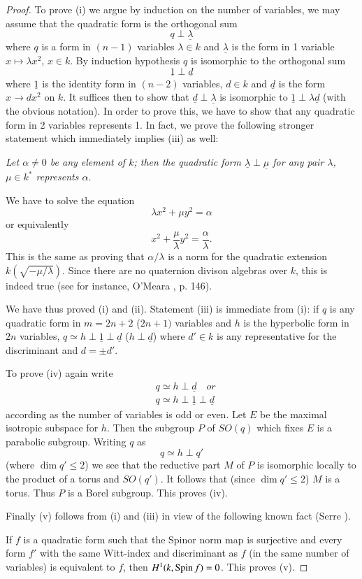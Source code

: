\begin{proof}
To prove (i) we argue by induction on the number of variables, we may assume that the quadratic form is the orthogonal sum
$$
q \perp \underline{\lambda}
$$
where $q$ is a form in $(n-1)$ variables $\lambda \in k$ and $\underline{\lambda}$ is the form in 1 variable $x \mapsto \lambda x^2$, $x \in k$.  By induction hypothesis $q$ is isomorphic to the orthogonal sum 
$$
\underline{1} \perp \underline{d}
$$
where $\underline{1}$  is the identity form in $(n-2)$ variables, $d \in k$ and $\underline{d}$ is the form $x \to d x^2$ on $k$. It suffices then to show that $\underline{d}\perp \underline{\lambda}$ is isomorphic to $\underline{1}\perp \lambda \underline{d}$ (with the obvious notation). In order to prove this, we have to show that any quadratic form in 2 variables represents 1. In fact, we prove the following stronger statement which immediately implies (iii) as well:


{\em Let $\alpha \neq 0$ be any element of $k$; then the quadratic form $\underline{\lambda} \perp \underline{\mu}$ for any pair $\lambda$, $\mu \in k^*$ represents $\alpha$.}

We have to solve the equation
$$
\lambda x^2 + \mu y^2 = \alpha
$$
or equivalently\pageoriginale
$$
x^2 + \frac{\mu}{\lambda} y^2 = \frac{\alpha}{\lambda}.
$$
This is the same as proving that $\alpha/\lambda$ is a norm for the quadratic extension $k(\sqrt{-\mu/\lambda})$. Since there are no quaternion divison algebras over $k$, this is indeed true (see for instance, O'Meara \cite{art17-key15}, p. 146).

We have thus proved (i) and (ii). Statement (iii) is immediate from (i): if $q$ is any quadratic form in $m = 2n + 2$ (\resp $2n +1)$ variables and $h$ is the hyperbolic form in $2n$ variables, $q \simeq h \perp \underline{1} \perp \underline{d}$ (\resp $h \perp \underline{d}$) where $d' \in k$ is any representative for the discriminant and $d = \pm d'$.

To prove (iv) again write
\begin{align*}
& q \simeq h \perp \underline{d} \quad { or }\\
& q \simeq h \perp \underline{1} \perp \underline{d}
\end{align*}
according as the number of variables is odd or even. Let $E$ be the maximal isotropic subspace for $h$. Then the subgroup $P$ of $SO(q)$ which fixes $E$ is a parabolic subgroup. Writing $q$ as
$$
q \simeq h \perp q'
$$
(where $\dim q ' \leqslant 2$) we see that the reductive part $M$ of $P$ is isomorphic locally to the product of a torus and $SO(q')$. It follows that (since $\dim q' \leqslant 2$) $M$ is a torus. Thus $P$ is a Borel subgroup. This proves (iv).

Finally (v) follows from (i) and (iii) in view of the following known fact (Serre \cite[III-25]{art17-key12}).

If $f$ is a quadratic form such that the Spinor norm map is surjective and every form $f'$ with the same Witt-index and discriminant as $f$ (in the same number of variables) is equivalent to $f$, then $H^1 (k, \operatorname{Spin} f) =0$. This proves (v).

\end{proof}
